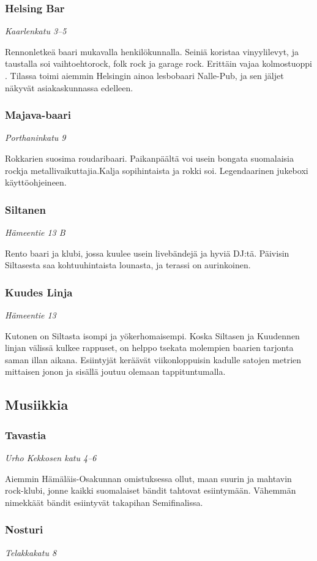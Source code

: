 \documentclass[../ala_hataile.tex]{subfiles}
\begin{document}
\subsubsection*{Helsing Bar}
\textit{Kaarlenkatu 3--5}

Rennonletkeä baari mukavalla henkilökunnalla. Seiniä koristaa vinyylilevyt, ja taustalla soi vaihtoehtorock, folk rock ja garage rock. Erittäin vajaa kolmostuoppi . Tilassa toimi aiemmin Helsingin ainoa lesbobaari Nalle-Pub, ja sen jäljet näkyvät asiakaskunnassa edelleen.
\subsubsection*{Majava-baari}
\textit{Porthaninkatu 9}

Rokkarien suosima roudaribaari. Paikanpäältä voi usein bongata suomalaisia rockja
metallivaikuttajia.Kalja sopihintaista ja
rokki soi. Legendaarinen jukeboxi käyttöohjeineen.
\subsubsection*{Siltanen}
\textit{Hämeentie 13 B}

Rento baari ja klubi, jossa kuulee usein livebändejä ja hyviä DJ:tä. Päivisin Siltasesta saa kohtuuhintaista lounasta, ja terassi on aurinkoinen.
\subsubsection*{Kuudes Linja}
\textit{Hämeentie 13}

Kutonen on Siltasta isompi ja yökerhomaisempi. Koska Siltasen ja Kuudennen linjan välissä kulkee rappuset, on helppo tsekata molempien baarien tarjonta saman illan aikana. Esiintyjät keräävät viikonloppuisin kadulle satojen metrien mittaisen jonon ja sisällä joutuu olemaan tappituntumalla.
\subsection*{Musiikkia}
\subsubsection*{Tavastia}
\textit{Urho Kekkosen katu 4--6}

Aiemmin Hämäläis-Osakunnan omistuksessa ollut, maan suurin ja mahtavin rock-klubi,
jonne kaikki suomalaiset bändit tahtovat
esiintymään. Vähemmän nimekkäät bändit
esiintyvät takapihan Semifinalissa.
\subsubsection*{Nosturi}
\textit{Telakkakatu 8}
\end{document}

